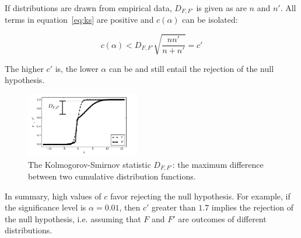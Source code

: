 \documentclass[12pt,fleqn]{article}
\begin{document}
If distributions are drawn from empirical data, $D_{F,F'}$ is given as are $n$ and $n'$.
All terms in equation~\ref{eq:ks} are positive and $c(\alpha)$ can be isolated:

\begin{equation}\label{eq:ks2}
	c(\alpha) < D_{F,F'}\sqrt{\frac{nn'}{n+n'}} = c'
\end{equation}

The higher $c'$ is, the lower $\alpha$ can be and still entail the rejection of the null hypothesis.

\begin{figure}[!h]
	\centering
	\includegraphics[width=0.44\textwidth]{../figs/Dnn}
	\caption{The Kolmogorov-Smirnov statistic $D_{F,F'}$: the maximum difference between
		two cumulative distribution functions.}
	\label{fig:dnn}
\end{figure}

In summary,
high values of $c$ favor rejecting the null hypothesis.
For example, if the significance level is $\alpha=0.01$,
then $c'$ greater than $1.7$
implies the rejection of the null hypothesis,
i.e. assuming that $F$ and $F'$
are outcomes of different distributions.
\end{document}
